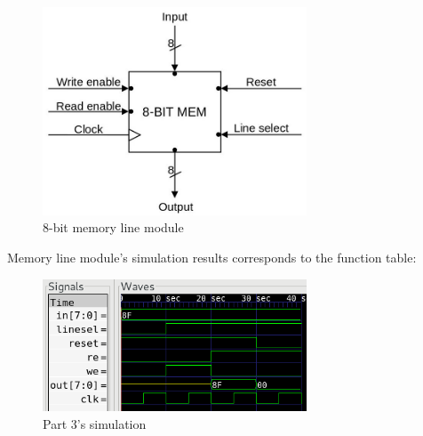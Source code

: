 \documentclass[pdftex,12pt,a4paper]{article}
\begin{document}
\begin{figure}[H]
\centering
\includegraphics[width=0.7\textwidth]{part3_diagram.jpg}
\caption{8-bit memory line module}
\end{figure}

Memory line module's simulation results corresponds to the function table:

\begin{figure}[H]
\centering
\includegraphics[width=0.7\textwidth]{part3_wave.png}
\caption{Part 3's simulation}
\end{figure}
\end{document}
